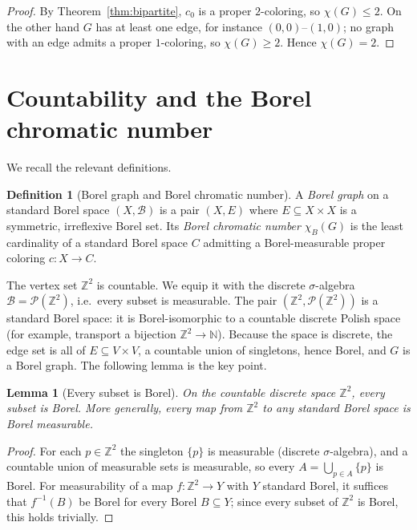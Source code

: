 \documentclass[11pt]{article}
\newtheorem{lemma}[theorem]{Lemma}
\theoremstyle{definition}
\newtheorem{definition}[theorem]{Definition}
\begin{document}
\begin{proof}
By Theorem~\ref{thm:bipartite}, $c_0$ is a proper $2$-coloring, so
$\chi(G)\le 2$. On the other hand $G$ has at least one edge, for instance
$(0,0)$--$(1,0)$; no graph with an edge admits a proper $1$-coloring, so
$\chi(G)\ge 2$. Hence $\chi(G)=2$.
\end{proof}

\section{Countability and the Borel chromatic number}

We recall the relevant definitions.

\begin{definition}[Borel graph and Borel chromatic number]
A \emph{Borel graph} on a standard Borel space $(X,\mathcal{B})$ is a pair
$(X,E)$ where $E\subseteq X\times X$ is a symmetric, irreflexive Borel set. Its
\emph{Borel chromatic number} $\chi_B(G)$ is the least cardinality of a standard
Borel space $C$ admitting a Borel-measurable proper coloring $c\colon X\to C$.
\end{definition}

The vertex set $\mathbb{Z}^2$ is countable. We equip it with the discrete
$\sigma$-algebra $\mathcal{B}=\mathcal{P}(\mathbb{Z}^2)$, i.e.\ every subset is
measurable. The pair $(\mathbb{Z}^2,\mathcal{P}(\mathbb{Z}^2))$ is a standard
Borel space: it is Borel-isomorphic to a countable discrete Polish space (for
example, transport a bijection $\mathbb{Z}^2\to\mathbb{N}$). Because the space is
discrete, the edge set is all of $E\subseteq V\times V$, a countable union of
singletons, hence Borel, and $G$ is a Borel graph. The following lemma is the
key point.

\begin{lemma}[Every subset is Borel]
\label{lem:all-borel}
On the countable discrete space $\mathbb{Z}^2$, every subset is Borel. More
generally, every map from $\mathbb{Z}^2$ to any standard Borel space is Borel
measurable.
\end{lemma}

\begin{proof}
For each $p\in\mathbb{Z}^2$ the singleton $\{p\}$ is measurable (discrete
$\sigma$-algebra), and a countable union of measurable sets is measurable, so
every $A=\bigcup_{p\in A}\{p\}$ is Borel. For measurability of a map
$f\colon\mathbb{Z}^2\to Y$ with $Y$ standard Borel, it suffices that
$f^{-1}(B)$ be Borel for every Borel $B\subseteq Y$; since every subset of
$\mathbb{Z}^2$ is Borel, this holds trivially.
\end{proof}
\end{document}
